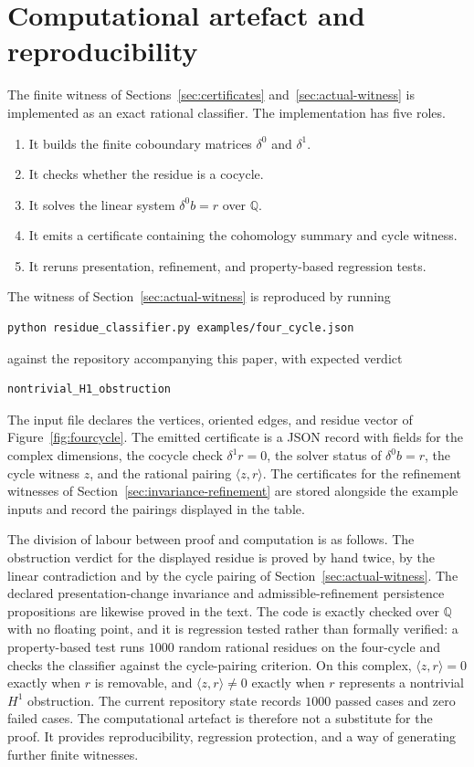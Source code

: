 \documentclass[11pt]{article}
\newcommand{\Q}{\mathbb{Q}}
\begin{document}
\section{Computational artefact and reproducibility}
\label{sec:repro}

The finite witness of Sections~\ref{sec:certificates} and~\ref{sec:actual-witness} is implemented as an exact rational classifier. The implementation has five roles.

\begin{enumerate}[label=(\arabic*)]
\item It builds the finite coboundary matrices \(\delta^0\) and \(\delta^1\).
\item It checks whether the residue is a cocycle.
\item It solves the linear system \(\delta^0b=r\) over \(\Q\).
\item It emits a certificate containing the cohomology summary and cycle witness.
\item It reruns presentation, refinement, and property-based regression tests.
\end{enumerate}

The witness of Section~\ref{sec:actual-witness} is reproduced by running
\begin{verbatim}
python residue_classifier.py examples/four_cycle.json
\end{verbatim}
against the repository accompanying this paper, with expected verdict
\begin{verbatim}
nontrivial_H1_obstruction
\end{verbatim}
The input file declares the vertices, oriented edges, and residue vector of Figure~\ref{fig:fourcycle}. The emitted certificate is a JSON record with fields for the complex dimensions, the cocycle check \(\delta^1 r=0\), the solver status of \(\delta^0 b=r\), the cycle witness \(z\), and the rational pairing \(\langle z,r\rangle\). The certificates for the refinement witnesses of Section~\ref{sec:invariance-refinement} are stored alongside the example inputs and record the pairings displayed in the table.

The division of labour between proof and computation is as follows. The obstruction verdict for the displayed residue is proved by hand twice, by the linear contradiction and by the cycle pairing of Section~\ref{sec:actual-witness}. The declared presentation-change invariance and admissible-refinement persistence propositions are likewise proved in the text. The code is exactly checked over \(\Q\) with no floating point, and it is regression tested rather than formally verified: a property-based test runs \(1000\) random rational residues on the four-cycle and checks the classifier against the cycle-pairing criterion. On this complex, \(\langle z,r\rangle=0\) exactly when \(r\) is removable, and \(\langle z,r\rangle\neq 0\) exactly when \(r\) represents a nontrivial \(H^1\) obstruction. The current repository state records \(1000\) passed cases and zero failed cases. The computational artefact is therefore not a substitute for the proof. It provides reproducibility, regression protection, and a way of generating further finite witnesses.
\end{document}
